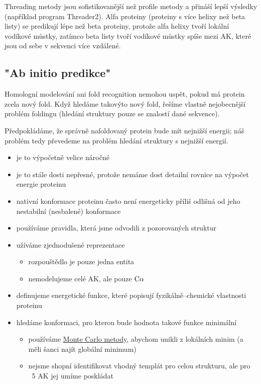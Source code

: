 \documentclass[DIV=8]{scrreprt}
\begin{document}
Threading metody jsou sofistikovanější než profile metody a přináší lepší výsledky (například program Threader2). Alfa proteiny (proteiny s více helixy než beta listy) se predikují lépe než beta proteiny, protože alfa helixy tvoří lokální vodíkové můstky, zatímco beta listy tvoří vodíkové můstky spíše mezi AK, které jsou od sebe v sekvenci více vzdálené.

\subsection{"Ab initio predikce"}

Homologní modelování ani fold recognition nemohou uspět, pokud má protein zcela nový fold. Když hledáme takovýto nový fold, řešíme vlastně nejobecnější problém foldingu (hledání struktury pouze se znalostí dané sekvence).

Předpokládáme, že správně nafoldovaný protein bude mít nejnižší energii; náš problém tedy převedeme na problém hledání struktury s nejnižší energií.

\begin{itemize}
    \item je to výpočetně velice náročné
    \item je to stále dosti nepřesné, protože nemáme dost detailní rovnice na výpočet energie proteinu
    \item nativní konformace proteinu často není energeticky příliš odlišná od jeho nestabilní (nesbalené) konformace
\end{itemize}


\begin{itemize}
    \item používáme pravidla, která jsme odvodili z pozorovaných struktur
    \item užíváme zjednodušené reprezentace
\begin{itemize}
    \item rozpouštědlo je pouze jedna entita
    \item nemodelujeme celé AK, ale pouze \(\ce{C\alpha}\)
\end{itemize}

    \item definujeme energetické funkce, které popisují fyzikálně--chemické vlastnosti proteinu
    \item hledáme konformaci, pro kterou bude hodnota takové funkce minimální
\begin{itemize}
    \item používáme \href{https://cs.wikipedia.org/wiki/Metoda_Monte_Carlo}{Monte Carlo metody}, abychom unikli z lokálních minim (a měli šanci najít globální minimum)
    \item nejsme shopní identifikovat vhodný templát pro celou strukturu, ale pro ~5 AK jej umíme poskládat
\end{itemize}

\end{itemize}
\end{document}
